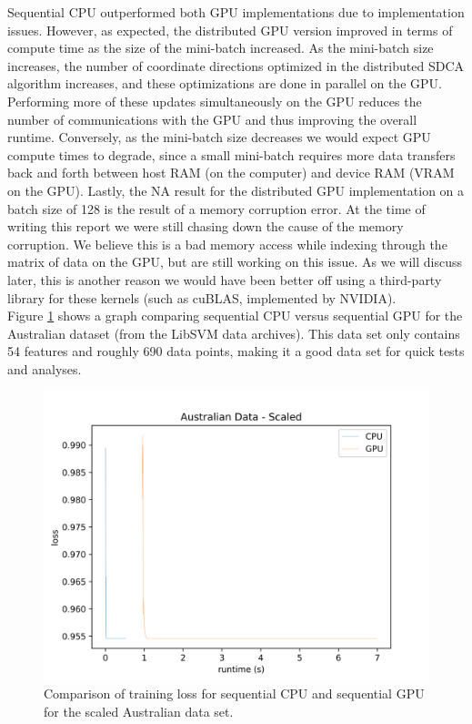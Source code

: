 \documentclass{article}
\begin{document}
Sequential CPU outperformed both GPU implementations due to implementation
issues. However, as expected, the distributed GPU version improved in terms of
compute time as the size of the mini-batch increased. As the mini-batch size
increases, the number of coordinate directions optimized in the distributed
SDCA algorithm increases, and these optimizations are done in parallel on the
GPU. Performing more of these updates simultaneously on the GPU reduces the
number of communications with the GPU and thus improving  the overall runtime.
Conversely, as the mini-batch size decreases we would expect GPU compute times
to degrade, since a small mini-batch requires more data transfers back and
forth between host RAM (on the computer) and device RAM (VRAM on the
GPU). Lastly, the NA result for the distributed GPU implementation on a batch
size of 128 is the result of a memory corruption error. At the time of writing
this report we were still chasing down the cause of the memory corruption. We
believe this is a bad memory access while indexing through the matrix of data on
the GPU, but are still working on this issue. As we will discuss later, this is
another reason we would have been better off using a third-party library for
these kernels (such as cuBLAS, implemented by NVIDIA).\\

Figure \ref{fig:australian} shows a graph comparing sequential CPU versus
sequential GPU for the Australian dataset (from the LibSVM data archives). This
data set only contains 54 features and roughly 690 data points, making it a good
data set for quick tests and analyses.

\begin{figure}
  \includegraphics[scale=0.5]{cpu_vs_gpu}
  \centering
  \caption{Comparison of training loss for sequential CPU and sequential GPU for
    the scaled Australian data set.}
  \label{fig:australian}
\end{figure}
\end{document}
